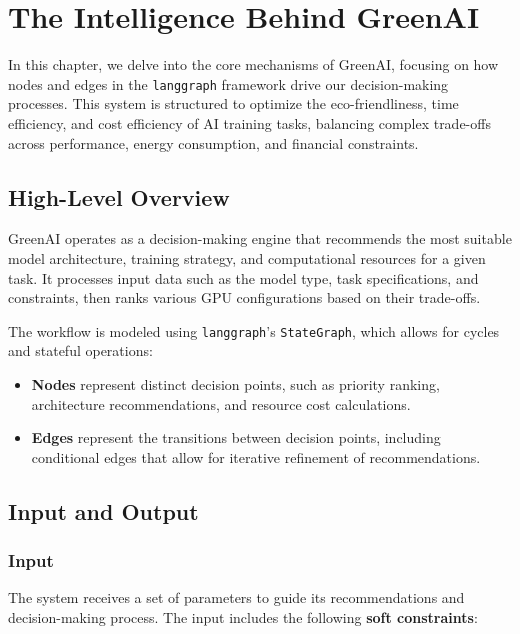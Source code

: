 \documentclass{report}
\begin{document}
\chapter{The Intelligence Behind GreenAI}

In this chapter, we delve into the core mechanisms of GreenAI, focusing on how nodes and edges in the \texttt{langgraph} framework drive our decision-making processes. This system is structured to optimize the eco-friendliness, time efficiency, and cost efficiency of AI training tasks, balancing complex trade-offs across performance, energy consumption, and financial constraints.

\section{High-Level Overview}

GreenAI operates as a decision-making engine that recommends the most suitable model architecture, training strategy, and computational resources for a given task. It processes input data such as the model type, task specifications, and constraints, then ranks various GPU configurations based on their trade-offs. 

The workflow is modeled using \texttt{langgraph}'s \texttt{StateGraph}, which allows for cycles and stateful operations:

\begin{itemize}
    \item \textbf{Nodes} represent distinct decision points, such as priority ranking, architecture recommendations, and resource cost calculations.
    \item \textbf{Edges} represent the transitions between decision points, including conditional edges that allow for iterative refinement of recommendations.
\end{itemize}

\section{Input and Output}

\subsection{Input}
The system receives a set of parameters to guide its recommendations and decision-making process. The input includes the following \textbf{soft constraints}:
\end{document}
